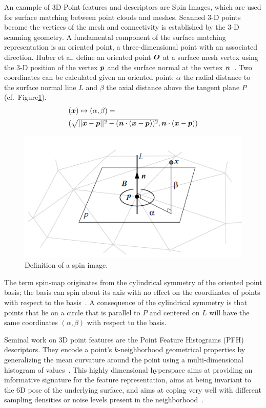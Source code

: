 \documentclass[twocolumn,oneside]{book}
\newcommand{\V}[1]{\vector{#1}}  %
\begin{document}
\begin{itemize}
  An example of 3D Point features and descriptors are Spin Images,
  which are used for surface matching between point clouds and meshes.
  Scanned 3-D points become the vertices of the mesh and connectivity
  is established by the 3-D scanning geometry. A fundamental component
  of the surface matching representation is an oriented point, a
  three-dimensional point with an associated direction.  Huber et
  al. define an oriented point $\V O$ at a surface mesh vertex using
  the 3-D position of the vertex $\V p$ and the surface normal at the
  vertex $\V n$~\cite{HuberPhD}.  Two coordinates can be calculated
  given an oriented point: $\alpha$ the radial distance to the surface
  normal line $L$ and $\beta$ the axial distance above the tangent
  plane $P$ (cf.~Figure\ref{fig:spinimage}).
  \begin{align*}
    \begin{array}{l}
  (\V x) \mapsto (\alpha, \beta) = \\[1.1ex]
    (\sqrt{||\V x - \V p||^2 - ( \V n \cdot (\V x -\V p))^2},
      \V n \cdot (\V x - \V p))
      \end{array}
  \end{align*}
  \begin{figure}
    \centering
    \includegraphics[width=0.75\linewidth]{BOOKFIGS/spinimage}
    \caption{Definition of a spin image.}\label{fig:spinimage}
  \end{figure}

  The term spin-map originates from the cylindrical symmetry of the
  oriented point basis; the basis can spin about its axis with no
  effect on the coordinates of points with respect to the
  basis~\cite{HuberPhD}. A consequence of the cylindrical symmetry is
  that points that lie on a circle that is parallel to $P$ and centered
  on $L$ will have the same coordinates $(\alpha,\beta)$ with respect
  to the basis.
 
  Seminal work on 3D point features are the Point Feature Histograms
  (PFH) descriptors. They encode a point's $k$-neighborhood geometrical
  properties by generalizing the mean curvature around the point using
  a multi-dimensional histogram of values~\cite{RaduPhD}. This highly
  dimensional hyperspace aims at providing an informative signature
  for the feature representation, aims at being invariant to the 6D
  pose of the underlying surface, and aims at coping very well with
  different sampling densities or noise levels present in the
  neighborhood~\cite{pointclouds.org}.


\end{itemize}
\end{document}

